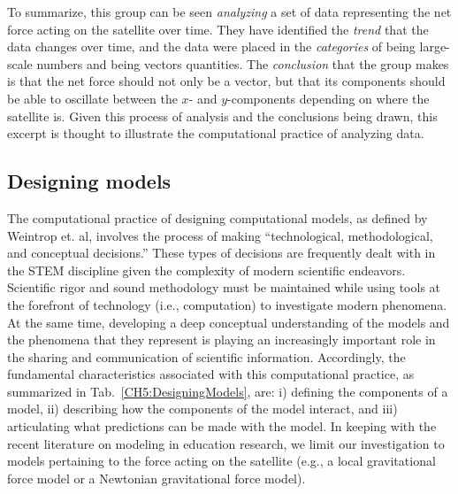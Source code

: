 \documentclass{msuphddissertation}
\begin{document}
\begin{doublespace}
To summarize, this group can be seen \textit{analyzing} a set of data representing the net force acting on the satellite over time.  They have identified the \textit{trend} that the data changes over time, and the data were placed in the \textit{categories} of being large-scale numbers and being vectors quantities.  The \textit{conclusion} that the group makes is that the net force should not only be a vector, but that its components should be able to oscillate between the $x$- and $y$-components depending on where the satellite is.  Given this process of analysis and the conclusions being drawn, this excerpt is thought to illustrate the computational practice of analyzing data.

%
%
%
%
%
%
%
%
%
%
%
%
%
%
%
%

\subsection{Designing models}\label{CH5:SecDesigingModels}

The computational practice of designing computational models, as defined by Weintrop et. al, involves the process of making ``technological, methodological, and conceptual decisions.''  These types of decisions are frequently dealt with in the STEM discipline given the complexity of modern scientific endeavors.  Scientific rigor and sound methodology must be maintained while using tools at the forefront of technology (i.e., computation) to investigate modern phenomena.  At the same time, developing a deep conceptual understanding of the models and the phenomena that they represent is playing an increasingly important role in the sharing and communication of scientific information.  Accordingly, the fundamental characteristics associated with this computational practice, as summarized in Tab.~\ref{CH5:DesigningModels}, are: i) defining the components of a model, ii) describing how the components of the model interact, and iii) articulating what predictions can be made with the model.  In keeping with the recent literature on modeling in education research, we limit our investigation to models pertaining to the force acting on the satellite (e.g., a local gravitational force model or a Newtonian gravitational force model).


\end{doublespace}
\end{document}
